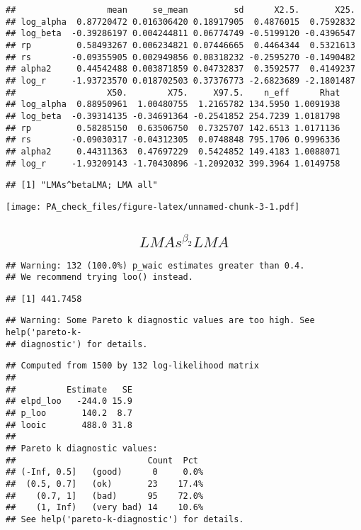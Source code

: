 \documentclass[12pt,]{article}
\begin{document}
\begin{verbatim}
##                  mean     se_mean         sd      X2.5.       X25.
## log_alpha  0.87720472 0.016306420 0.18917905  0.4876015  0.7592832
## log_beta  -0.39286197 0.004244811 0.06774749 -0.5199120 -0.4396547
## rp         0.58493267 0.006234821 0.07446665  0.4464344  0.5321613
## rs        -0.09355905 0.002949856 0.08318232 -0.2595270 -0.1490482
## alpha2     0.44542488 0.003871859 0.04732837  0.3592577  0.4149237
## log_r     -1.93723570 0.018702503 0.37376773 -2.6823689 -2.1801487
##                  X50.        X75.     X97.5.    n_eff      Rhat
## log_alpha  0.88950961  1.00480755  1.2165782 134.5950 1.0091938
## log_beta  -0.39314135 -0.34691364 -0.2541852 254.7239 1.0181798
## rp         0.58285150  0.63506750  0.7325707 142.6513 1.0171136
## rs        -0.09030317 -0.04312305  0.0748848 795.1706 0.9996336
## alpha2     0.44311363  0.47697229  0.5424852 149.4183 1.0088071
## log_r     -1.93209143 -1.70430896 -1.2092032 399.3964 1.0149758
\end{verbatim}

\begin{verbatim}
## [1] "LMAs^betaLMA; LMA all"
\end{verbatim}

\texttt{[image: PA\_check\_files/figure-latex/unnamed-chunk-3-1.pdf]}

\newpage

\subsection{\texorpdfstring{\[LMAs^{\beta_2}LMA\]}{LMAs\^{}\{\textbackslash{}beta\_2\}LMA}}\label{lmasbeta_2lma}

\begin{verbatim}
## Warning: 132 (100.0%) p_waic estimates greater than 0.4.
## We recommend trying loo() instead.
\end{verbatim}

\begin{verbatim}
## [1] 441.7458
\end{verbatim}

\begin{verbatim}
## Warning: Some Pareto k diagnostic values are too high. See help('pareto-k-
## diagnostic') for details.
\end{verbatim}

\begin{verbatim}
## Computed from 1500 by 132 log-likelihood matrix
## 
##          Estimate   SE
## elpd_loo   -244.0 15.9
## p_loo       140.2  8.7
## looic       488.0 31.8
## 
## Pareto k diagnostic values:
##                          Count  Pct 
## (-Inf, 0.5]   (good)      0     0.0%
##  (0.5, 0.7]   (ok)       23    17.4%
##    (0.7, 1]   (bad)      95    72.0%
##    (1, Inf)   (very bad) 14    10.6%
## See help('pareto-k-diagnostic') for details.
\end{verbatim}
\end{document}
